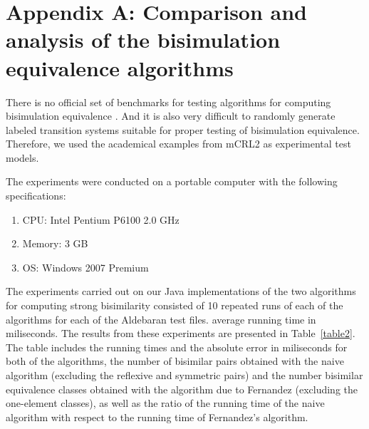 \section*{Appendix A: Comparison and analysis of the bisimulation equivalence algorithms}
\label{appendixA}

There is no official set of benchmarks for testing algorithms for computing bisimulation equivalence \cite{PiazzaPolicriti}. And it is also very difficult to randomly generate labeled transition systems suitable for proper testing of bisimulation equivalence. Therefore, we used the academical examples from mCRL2 as experimental test models. 

The experiments were conducted on a portable computer with the following specifications: 
\begin{enumerate}
	\item CPU: Intel Pentium P6100 2.0 GHz
	\item Memory: 3 GB
	\item OS: Windows 2007 Premium
\end{enumerate}

The experiments carried out on our Java implementations of the two algorithms for computing strong bisimilarity consisted of 10 repeated runs of each of the algorithms for each of the Aldebaran test files. average running time in miliseconds. 
The results from these experiments are presented in Table~\ref{table2}. The table includes the running times and the absolute error in miliseconds for both of the algorithms, the number of bisimilar pairs obtained with the naive algorithm (excluding the reflexive and symmetric pairs) and the number bisimilar equivalence classes obtained with the algorithm due to Fernandez (excluding the one-element classes), as well as the ratio of the running time of the naive algorithm with respect to the running time of Fernandez's algorithm.

